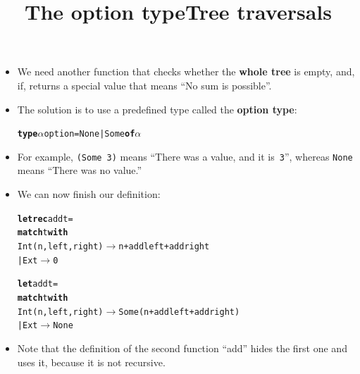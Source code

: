 \documentclass[wide]{slides}
\begin{document}
\begin{slide}
  \title{The option type}

  \begin{itemize}

    \item We need another function that checks whether the
      \textbf{whole tree} is empty, and, if, returns a special value
      that means ``No sum is possible''.

    \item The solution is to use a predefined type called the
      \textbf{option type}:
      \smallskip
\begin{alltt}
\textbf{type} \(\alpha\) option = None | Some \textbf{of} \(\alpha\)
\end{alltt}

    \item For example, \texttt{(Some 3)} means ``There was a value,
      and it is~\texttt{3}'', whereas \texttt{None} means ``There was
      no value.''

  \end{itemize}

\end{slide}

\begin{slide}
  \title{Tree traversals}

  \begin{itemize}

    \item We can now finish our definition:
    \smallskip
\begin{alltt}
\textbf{let rec} add t =
  \textbf{match} t \textbf{with}
    Int (n,left,right) \(\rightarrow\) n + add left + add right
  | Ext \(\rightarrow\) 0

\textbf{let} add t =
  \textbf{match} t \textbf{with}
    Int (n,left,right) \(\rightarrow\) Some (n + add left + add right)
  | Ext \(\rightarrow\) None
\end{alltt}

   \item Note that the definition of the second function ``add'' hides
     the first one and uses it, because it is not recursive.

  \end{itemize}

\end{slide}
\end{document}
